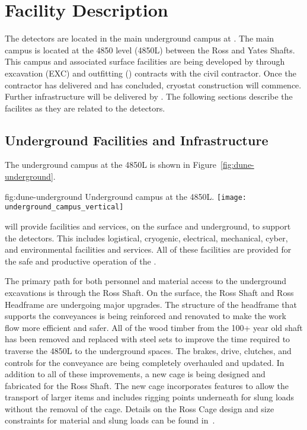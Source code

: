 \chapter{Facility Description}
\label{vl:tc-facility}

The  detectors are located in the main underground campus
at . The main campus is located at the 4850 level (4850L) between
the Ross and Yates Shafts. This campus and associated surface
facilities are being developed by  through excavation
(EXC) and outfitting () contracts with the civil
contractor. Once the contractor has delivered and  has
concluded, cryostat construction will commence. Further infrastructure
will be delivered by .  The following sections describe
the facilites as they are related to the  detectors.

\section{Underground Facilities and Infrastructure}
\label{sec:fdsp-coord-uderground-excavation}

The  underground campus at the  4850L is shown in
Figure~\ref{fig:dune-underground}.
\begin{dunefigure}{fig:dune-underground}
  {Underground campus at the 4850L.}
  \texttt{[image: underground\_campus\_vertical]}
\end{dunefigure}
 will provide facilities and services, on the surface and
underground, to support the  detectors.  This includes
logistical, cryogenic, electrical, mechanical, cyber, and environmental
facilities and services.  All of these facilities are provided for the
safe and productive operation of the .

The primary path for both personnel and material access to the
underground excavations is through the Ross Shaft. On the surface, the
Ross Shaft and Ross Headframe are undergoing major upgrades. The
structure of the headframe that supports the conveyances is being
reinforced and renovated to make the work flow more efficient and
safer.  All of the wood timber from the 100+ year old shaft has been
removed and replaced with steel sets to improve the time required to
traverse the 4850L to the underground spaces.  The brakes, drive,
clutches, and controls for the conveyance are being completely
overhauled and updated.  In addition to all of these improvements, a
new cage is being designed and fabricated for the Ross Shaft.  The new
cage incorporates features to allow the transport of larger items and
includes rigging points underneath for slung loads without the removal
of the cage.  Details on the Ross Cage design and size constraints for
material and slung loads can be found in~.

